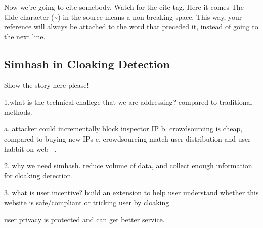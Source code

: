 Now we're going to cite somebody.  Watch
for the cite tag.
Here it comes%
The tilde character (\~{})
in the source means a non-breaking space.
This way, your reference will
always be attached to the word that preceded it,
instead of going to the
next line.


\subsection{Simhash in Cloaking Detection}
Show the story here please!

1.what is the technical challege that we are addressing? compared to traditional
methods.

a. attacker could incrementally block inspector IP
b. crowdsourcing is cheap, compared to buying new IPs
c. crowdsourcing match user distribution and user habbit on web ~\cite{wang2011cloak}.

2. why we need simhash.
reduce volume of data, and collect enough information for cloaking detection.


3. what is user incentive?
build an extension to help user understand whether this website is
safe/compliant or tricking user by cloaking

user privacy is protected and can get better service.




